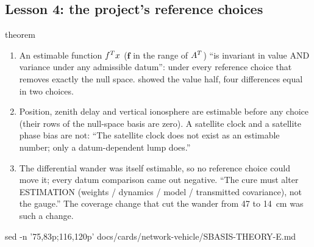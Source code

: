 \subsection*{Lesson 4: the project's reference choices}

\begin{answer}{theorem}
\solution
\begin{enumerate}[leftmargin=*, itemsep=1pt]
\item An estimable function $f^{T}x$ ($\bm{f}$ in the range of $A^{T}$)
      ``is invariant in value AND variance under any admissible datum'': under every
      reference choice that removes exactly the null space. 
      showed the value half, four differences equal in two choices.
\item Position, zenith delay and vertical ionosphere are estimable before any
      choice (their rows of the null-space basis are zero). A satellite clock and a
      satellite phase bias are not: ``The satellite clock does not exist as an
      estimable number; only a datum-dependent lump does.''
\item The differential wander was itself estimable, so no reference choice could
      move it; every datum comparison came out negative. ``The cure must alter
      ESTIMATION (weights / dynamics / model / transmitted covariance), not the
      gauge.'' The coverage change that cut the wander from 47 to 14~cm was such a
      change.
\end{enumerate}
\chk
\begin{cmd}
sed -n '75,83p;116,120p' docs/cards/network-vehicle/SBASIS-THEORY-E.md
\end{cmd}
\end{answer}

